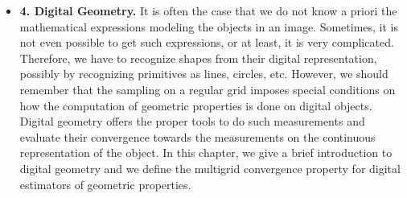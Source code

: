 \begin{itemize}
\item[]{\textbf{4. Digital Geometry.} It is often the case that we do not know a priori the mathematical expressions modeling the objects in an image. Sometimes, it is not even possible to get such expressions, or at least, it is very complicated. Therefore, we have to recognize shapes from their digital representation, possibly by recognizing primitives as lines, circles, etc. However, we should remember that the sampling on a regular grid  imposes special conditions on how the computation of geometric properties is done on digital objects. Digital geometry offers the proper tools to do such measurements and evaluate their convergence towards the measurements on the continuous representation of the object. In this chapter, we give a brief introduction to digital geometry and we define the multigrid convergence property for digital estimators of geometric properties.}
\end{itemize}

